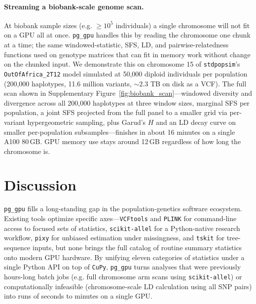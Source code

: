 \documentclass[12pt]{article}
\newcommand{\pggpu}{\texttt{pg\_gpu}\xspace}
\newcommand{\vcftools}{\texttt{VCFtools}\xspace}
\newcommand{\scikitallel}{\texttt{scikit-allel}\xspace}
\newcommand{\pixy}{\texttt{pixy}\xspace}
\newcommand{\plink}{\texttt{PLINK}\xspace}
\newcommand{\tskit}{\texttt{tskit}\xspace}
\newcommand{\cupy}{\texttt{CuPy}\xspace}
\begin{document}
\paragraph{Streaming a biobank-scale genome scan.}
At biobank sample sizes (e.g. $\ge 10^5$ individuals) a single chromosome will not fit on a GPU
all at once. \pggpu handles this by reading the chromosome one
chunk at a time; the same windowed-statistic, SFS, LD, and
pairwise-relatedness functions used on genotype matrices that can fit in memory work
without change on the chunked input. We demonstrate this on
chromosome 15 of \texttt{stdpopsim}'s \texttt{OutOfAfrica\_2T12}
model simulated at 50{,}000 diploid individuals per population
(200{,}000 haplotypes, 11.6 million variants, $\sim 2.3$ TB on disk as a VCF).
The full scan shown in Supplementary
Figure~\ref{fig:biobank_scan}---windowed diversity and divergence
across all 200{,}000 haplotypes at three window sizes, marginal
SFS per population, a joint SFS projected from the full panel
to a smaller grid via per-variant hypergeometric sampling,
plus Garud's $H$ and an LD decay curve on smaller per-population
subsamples---finishes in about 16 minutes on a single A100 80\,GB. 
GPU memory use stays around 12\,GB regardless of how long the chromosome is.

\section*{Discussion}

\pggpu fills a long-standing gap in the population-genetics software
ecosystem. Existing tools optimize specific axes---\vcftools and
\plink for command-line access to focused sets of statistics,
\scikitallel for a Python-native research workflow, \pixy for
unbiased estimation under missingness, and \tskit for tree-sequence inputs,
but none brings the full catalog of routine summary
statistics onto modern GPU hardware. 
By unifying eleven categories of
statistics under a single Python API on top of \cupy, \pggpu turns
analyses that were previously hours-long batch jobs (e.g. full chromosome arm scans using
\scikitallel) or computationally infeasible
(chromosome-scale LD calculation using all SNP pairs) into runs of seconds to minutes on a single GPU.
\end{document}
